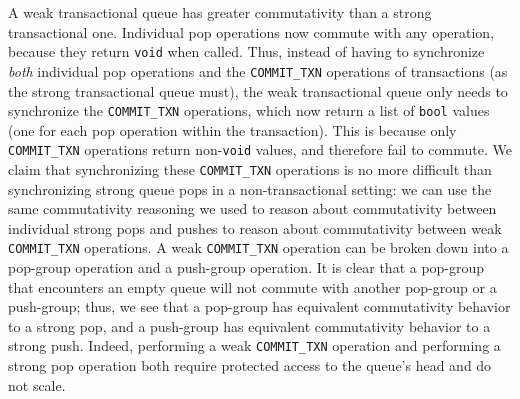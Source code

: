 A weak transactional queue has greater commutativity than a strong transactional one. Individual pop operations now commute with any operation, because they return \texttt{void} when called. Thus, instead of having to synchronize \emph{both} individual pop operations and the \texttt{COMMIT\_TXN} operations of transactions (as the strong transactional queue must), the weak transactional queue only needs to synchronize the \texttt{COMMIT\_TXN} operations, which now return a list of \texttt{bool} values (one for each pop operation within the transaction). This is because only \texttt{COMMIT\_TXN} operations return non-\texttt{void} values, and therefore fail to commute.
We claim that synchronizing these \texttt{COMMIT\_TXN} operations is no more difficult than synchronizing strong queue pops in a non-transactional setting: we can use the same commutativity reasoning we used to reason about commutativity between individual strong pops and pushes to reason about commutativity between weak \texttt{COMMIT\_TXN} operations. A weak \texttt{COMMIT\_TXN} operation can be broken down into a pop-group operation and a push-group operation. It is clear that a pop-group that encounters an empty queue will not commute with another pop-group or a push-group; thus, we see that a pop-group has equivalent commutativity behavior to a strong pop, and a push-group has equivalent commutativity behavior to a strong push. Indeed, performing a weak \texttt{COMMIT\_TXN} operation and performing a strong pop operation both require protected access to the queue's head and do not scale.

